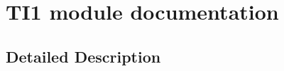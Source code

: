 \hypertarget{group___t_i1__module}{}\section{T\+I1 module documentation}
\label{group___t_i1__module}


\subsection{Detailed Description}

